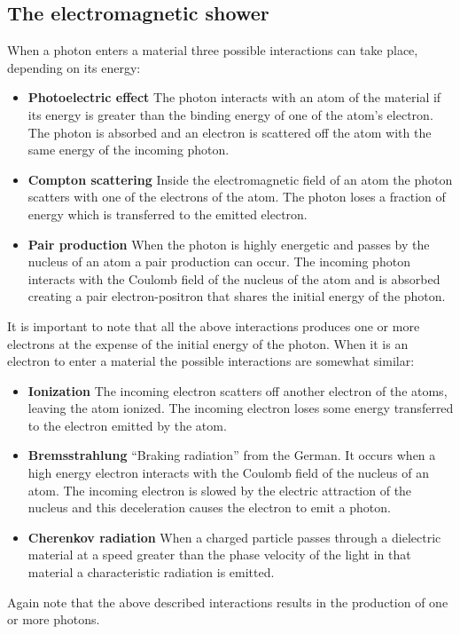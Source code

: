 \subsection{The electromagnetic shower}
When a photon enters a material three possible interactions can take place, depending on its energy:
\begin{itemize}
\item \textbf{Photoelectric effect} The photon interacts with an atom of the material if its energy is greater than the binding energy of one of the atom's electron. The photon is absorbed and an electron is scattered off the atom with the same energy of the incoming photon.
\item \textbf{Compton scattering} Inside the electromagnetic field of an atom the photon scatters with one of the electrons of the atom. The photon loses a fraction of energy which is transferred to the emitted electron.
\item \textbf{Pair production} When the photon is highly energetic and passes by the nucleus of an atom a pair production can occur. The incoming photon interacts with the Coulomb field of the nucleus of the atom and is absorbed creating a pair electron-positron that shares the initial energy of the photon.
\end{itemize}

It is important to note that all the above interactions produces one or more electrons at the expense of the initial energy of the photon.
When it is an electron to enter a material the possible interactions are somewhat similar:
\begin{itemize}
\item \textbf{Ionization} The incoming electron scatters off another electron of the atoms, leaving the atom ionized. The incoming electron loses some energy transferred to the electron emitted by the atom.
\item \textbf{Bremsstrahlung} ``Braking radiation'' from the German. It occurs when a high energy electron interacts with the Coulomb field of the nucleus of an atom. The incoming electron is slowed by the electric attraction of the nucleus and this deceleration causes the electron to emit a photon.
\item \textbf{Cherenkov radiation} When a charged particle passes through a dielectric material at a speed greater than the phase velocity of the light in that material a characteristic radiation is emitted. 
\end{itemize}

Again note that the above described interactions results in the production of one or more photons.\\

